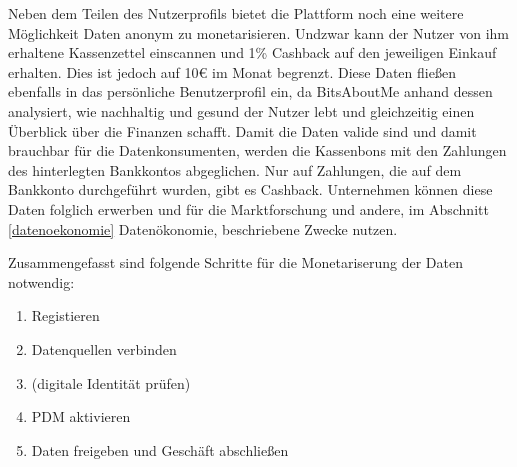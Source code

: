 \noindent Neben dem Teilen des Nutzerprofils bietet die Plattform noch eine weitere Möglichkeit Daten anonym zu monetarisieren. Undzwar kann der Nutzer von ihm erhaltene Kassenzettel einscannen und 1\% Cashback auf den jeweiligen Einkauf erhalten. Dies ist jedoch auf 10€ im Monat begrenzt. Diese Daten fließen ebenfalls in das persönliche Benutzerprofil ein, da BitsAboutMe anhand dessen analysiert, wie nachhaltig und gesund der Nutzer lebt und gleichzeitig einen Überblick über die Finanzen schafft. Damit die Daten valide sind und damit brauchbar für die Datenkonsumenten, werden die Kassenbons mit den Zahlungen des hinterlegten Bankkontos abgeglichen. Nur auf Zahlungen, die auf dem Bankkonto durchgeführt wurden, gibt es Cashback. Unternehmen können diese Daten folglich erwerben und für die Marktforschung und andere, im Abschnitt \ref{datenoekonomie} Datenökonomie, beschriebene Zwecke nutzen. \newline

\noindent Zusammengefasst sind folgende Schritte für die Monetariserung der Daten notwendig:
\begin{enumerate}
	\item Registieren
	\item Datenquellen verbinden
	\item (digitale Identität prüfen)
	\item PDM aktivieren
	\item Daten freigeben und Geschäft abschließen
\end{enumerate}
